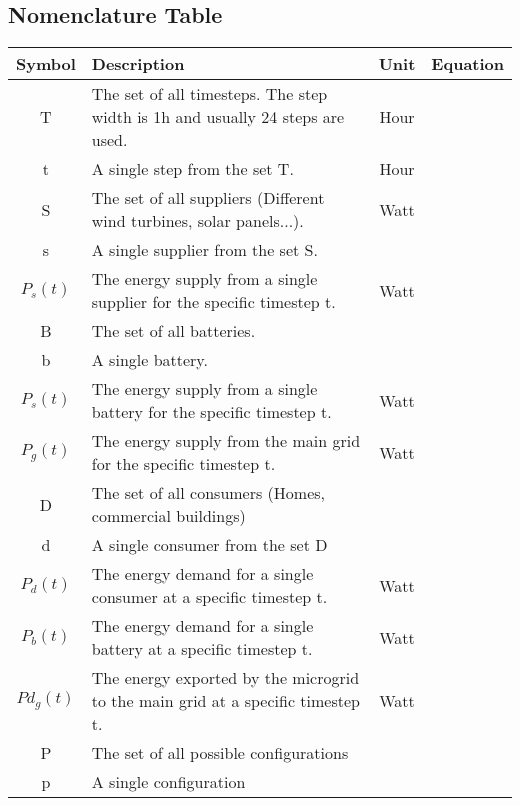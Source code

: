 \subsection{Nomenclature Table}
	\begin{longtable}{|c|p{}|c|c|}
		\toprule
		\textbf{Symbol} & \textbf{Description} & \textbf{Unit} & \textbf{Equation} \\ \midrule
		T & The set of all timesteps. The step width is 1h and usually 24 steps are used. & Hour & \Cref{eq1:balance,eq:opt} \\ \midrule
		t & A single step from the set T. & Hour & \Cref{eq1:balance,eq:opt} \\ \midrule
		S & The set of all suppliers (Different wind turbines, solar panels...). & Watt & \Cref{eq1:balance} \\ \midrule
		s & A single supplier from the set S. & & \Cref{eq1:balance} \\ \midrule
		$P_{s}(t)$ & The energy supply from a single supplier for the specific timestep t. & Watt & \Cref{eq1:balance} \\ \midrule
		B & The set of all batteries. & & \Cref{eq1:balance} \\ \midrule
		b & A single battery. & & \Cref{eq1:balance} \\ \midrule
		$P_{s}(t)$ & The energy supply from a single battery for the specific timestep t. & Watt & \Cref{eq1:balance} \\ \midrule
		$P_{g}(t)$ & The energy supply from the main grid for the specific timestep t. & Watt & \Cref{eq1:balance} \\ \midrule
		D & The set of all consumers (Homes, commercial buildings) & & \Cref{eq1:balance} \\ \midrule
		d & A single consumer from the set D & & \Cref{eq1:balance} \\ \midrule
		$P_{d}(t)$ & The energy demand for a single consumer at a specific timestep t. & Watt & \Cref{eq1:balance} \\ \midrule
		$P_{b}(t)$ & The energy demand for a single battery at a specific timestep t. & Watt & \Cref{eq1:balance} \\ \midrule
		$Pd_{g}(t)$ & The energy exported by the microgrid to the main grid at a specific timestep t. & Watt & \Cref{eq1:balance} \\
		P & The set of all possible configurations &  & \Cref{eq:opt} \\ \midrule
		p & A single configuration &  & \Cref{eq:opt} \\ \midrule

\end{longtable}
